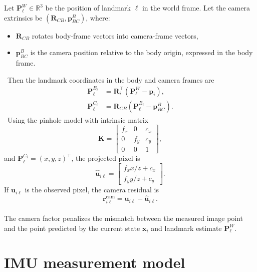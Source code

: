 \documentclass[11pt]{article}
\newcommand{\R}{\mathbb{R}}
\newcommand{\T}{^{\top}}
\begin{document}
Let \(\mathbf{P}_\ell^W\in\R^3\) be the position of landmark \(\ell\) in the world frame.
Let the camera extrinsics be \((\mathbf{R}_{CB},\mathbf{p}_{BC}^B)\), where:
\begin{itemize}
  \item \(\mathbf{R}_{CB}\) rotates body-frame vectors into camera-frame vectors,
  \item \(\mathbf{p}_{BC}^B\) is the camera position relative to the body origin, expressed in the body frame.
\end{itemize}
\
Then the landmark coordinates in the body and camera frames are
\begin{align}
\mathbf{P}_\ell^{B_i} &= \mathbf{R}_i\T (\mathbf{P}_\ell^W - \mathbf{p}_i), \\
\mathbf{P}_\ell^{C_i} &= \mathbf{R}_{CB}(\mathbf{P}_\ell^{B_i} - \mathbf{p}_{BC}^B).
\end{align}
\
Using the pinhole model with intrinsic matrix
\begin{equation}
\mathbf{K} =
\begin{bmatrix}
 f_x & 0   & c_x \\
 0   & f_y & c_y \\
 0   & 0   & 1
\end{bmatrix},
\end{equation}
and \(\mathbf{P}_\ell^{C_i}=(x,y,z)\T\), the projected pixel is
\begin{equation}
\hat{\mathbf{u}}_{i\ell} =
\begin{bmatrix}
 f_x x/z + c_x \\
 f_y y/z + c_y
\end{bmatrix}.
\end{equation}
If \(\mathbf{u}_{i\ell}\) is the observed pixel, the camera residual is
\begin{equation}
\mathbf{r}^{\mathrm{cam}}_{i\ell} = \mathbf{u}_{i\ell} - \hat{\mathbf{u}}_{i\ell}.
\end{equation}
\\
The camera factor penalizes the mismatch between the measured image point and the point predicted by the current state \(\mathbf{x}_i\) and landmark estimate \(\mathbf{P}_\ell^W\).

\section{IMU measurement model}
\end{document}
